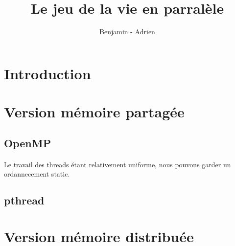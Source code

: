 \documentclass[12pt]{article}
\title{Le jeu de la vie en parralèle}
\author{Benjamin \bsc{Angelaud} - Adrien \bsc{Guilbaud}}
\begin{document}
\maketitle

\section{Introduction}

\section{Version mémoire partagée}
\subsection{OpenMP}
\paragraph{}Le travail des threads étant relativement uniforme, nous pouvons garder un ordannecement static.



\subsection{pthread}

\section{Version mémoire distribuée}
\end{document}
